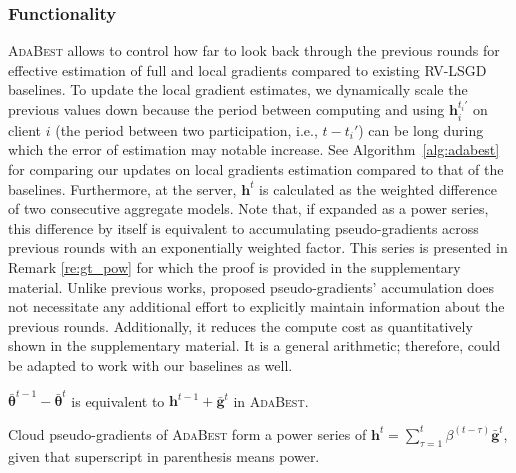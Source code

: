 \documentclass[runningheads]{llncs}
\def\algref#1{Algorithm~\ref{#1}}
\def\vtheta{{\bm{\theta}}}
\def\vg{{\bm{g}}}
\def\vh{{\bm{h}}}
\newcommand*\mean[1]{\bar{#1}}
\newcommand{\ours}{\textsc{AdaBest}\xspace}
\newcommand{\rvlsgd}{\textsc{RV-LSGD}\xspace}
\begin{document}
\subsubsection{Functionality}
\ours allows to control how far to look back through the previous rounds for effective estimation of full and local gradients compared to existing \rvlsgd baselines.
To update the local gradient estimates, we dynamically scale the previous values down because the period between computing and using $\vh_i^{t_i'}$ on client $i$ (the period between two participation, i.e., $t-t_i'$) can be long during which the error of estimation may notable increase.
See \algref{alg:adabest} for comparing our updates on local gradients estimation compared to that of the baselines.
Furthermore, at the server, $\vh^t$ is calculated as the weighted difference of two consecutive aggregate models.
Note that, if expanded as a power series, this difference by itself is equivalent to accumulating pseudo-gradients across previous rounds with an exponentially weighted factor.
This series is presented in Remark \ref{re:gt_pow} for which the proof is provided in the supplementary material.
Unlike previous works, proposed pseudo-gradients' accumulation does not necessitate any additional effort to explicitly maintain information about the previous rounds.
Additionally, it reduces the compute cost as quantitatively shown in the supplementary material.
It is a general arithmetic; therefore, could be adapted to work with our baselines as well.


\begin{remark}
\label{re:gt_rec}
$\mean{\vtheta}^{t-1}-\mean{\vtheta}^{t}$ is equivalent to $\vh^{t-1} + \mean{\vg}^{t}$ in \ours.
\end{remark}

\begin{remark}
\label{re:gt_pow}
Cloud pseudo-gradients of \ours form a power series of $\vh^t = \sum_{\tau=1}^{t} \beta^{(t-\tau)}\mean{\vg}^t$, given that superscript in parenthesis means power.
\end{remark}
\end{document}
